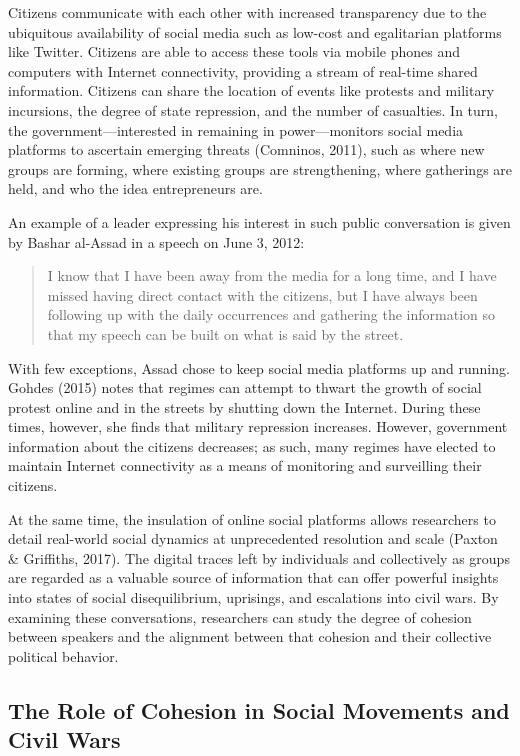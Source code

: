\documentclass[english,man]{apa6}
\begin{document}
Citizens communicate with each other with increased transparency due to the
ubiquitous availability of social media such as low-cost and egalitarian
platforms like Twitter. Citizens are able to access these tools via mobile
phones and computers with Internet connectivity, providing a stream of real-time
shared information. Citizens can share the location of events like protests and
military incursions, the degree of state repression, and the number of
casualties. In turn, the government---interested in remaining in
power---monitors social media platforms to ascertain emerging threats
(Comninos, 2011), such as where new groups are forming, where existing
groups are strengthening, where gatherings are held, and who the idea
entrepreneurs are.

An example of a leader expressing his interest in such public
conversation is given by Bashar al-Assad in a speech on June 3, 2012:

\begin{quote}
I know that I have been away from the media for a long time, and I have missed
having direct contact with the citizens, but I have always been following up
with the daily occurrences and gathering the information so that my speech can
be built on what is said by the street.
\end{quote}

\noindent With few exceptions, Assad chose to keep social media platforms up and running.
Gohdes (2015) notes that regimes can attempt to thwart the growth
of social protest online and in the streets by shutting down the Internet.
During these times, however, she finds that military repression increases.
However, government information about the citizens decreases; as such, many
regimes have elected to maintain Internet connectivity as a means of monitoring
and surveilling their citizens.

At the same time, the insulation of online social platforms allows researchers
to detail real-world social dynamics at unprecedented resolution and scale
(Paxton \& Griffiths, 2017). The digital traces left by individuals and collectively as
groups are regarded as a valuable source of information that can offer powerful
insights into states of social disequilibrium, uprisings, and escalations into
civil wars. By examining these conversations, researchers can study the degree
of cohesion between speakers and the alignment between that cohesion and their
collective political behavior.

\hypertarget{the-role-of-cohesion-in-social-movements-and-civil-wars}{%
\subsection{The Role of Cohesion in Social Movements and Civil Wars}\label{the-role-of-cohesion-in-social-movements-and-civil-wars}}
\end{document}
